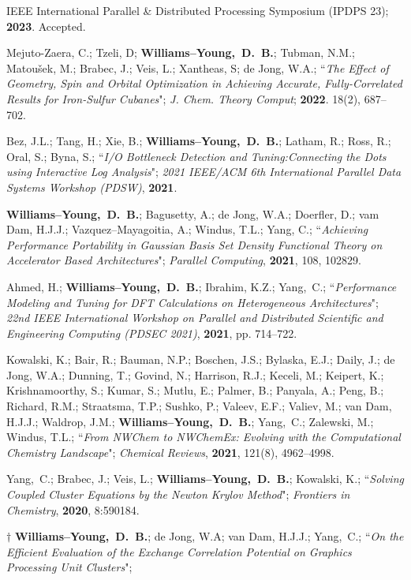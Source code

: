 \documentclass[10pt]{res} %
\newcommand*\me[0]{{\bf Williams--Young,~D.~B.}}
\newcommand*\cy[0]{Yang,~C.}
\begin{document}
\begin{resume}
\begin{etaremune}
        IEEE International Parallel \& Distributed Processing Symposium (IPDPS 23); \textbf{2023}. Accepted.
  \item Mejuto-Zaera, C.; Tzeli, D; \me; Tubman, N.M.; Matoušek, M.; Brabec, J.; Veis, L.; Xantheas, S; de Jong, W.A.; 
       ``\emph{The Effect of Geometry, Spin and Orbital Optimization in Achieving Accurate, Fully-Correlated Results for Iron-Sulfur 
                Cubanes}"; \emph{J. Chem. Theory Comput}; \textbf{2022}. 18(2), 687–702.
  \item Bez, J.L.; Tang, H.; Xie, B.; \me; Latham, R.; Ross, R.; Oral, S.; Byna, S.;
        ``\emph{I/O Bottleneck Detection and Tuning:Connecting the Dots using Interactive Log Analysis}";
        \emph{2021 IEEE/ACM 6th International Parallel Data Systems Workshop (PDSW)}, 
        \textbf{2021}.
  \item \me; Bagusetty, A.; de Jong, W.A.; Doerfler, D.; vam Dam, H.J.J.; Vazquez--Mayagoitia, A.;
        Windus, T.L.; Yang, C.;
        ``\emph{Achieving Performance Portability in Gaussian Basis Set Density Functional Theory 
                on Accelerator Based Architectures}"; \emph{Parallel Computing},
        \textbf{2021}, 108, 102829.
  \item Ahmed, H.; \me; Ibrahim, K.Z.; \cy;
        ``\emph{Performance Modeling and Tuning for DFT Calculations on Heterogeneous Architectures}";
        \emph{22nd IEEE International Workshop on Parallel and Distributed Scientific and Engineering Computing (PDSEC 2021)},
        \textbf{2021}, pp. 714--722.
  \item Kowalski, K.; Bair, R.; Bauman, N.P.; Boschen, J.S.; Bylaska, E.J.; Daily, J.; de Jong, W.A.; 
        Dunning, T.; Govind, N.; Harrison, R.J.; Keceli, M.; Keipert, K.; Krishnamoorthy, S.; Kumar, S.;
        Mutlu, E.; Palmer, B.; Panyala, A.; Peng, B.; Richard, R.M.; Straatsma, T.P.; Sushko, P.; Valeev, E.F.;
        Valiev, M.; van Dam, H.J.J.; Waldrop, J.M.; \me; \cy; Zalewski, M.; Windus, T.L.;
       ``\emph{From NWChem to NWChemEx: Evolving with the Computational Chemistry Landscape}"; \emph{Chemical Reviews},
       \textbf{2021}, 121(8), 4962--4998.
  \item \cy; Brabec, J.; Veis, L.; \me; Kowalski, K.;
        ``\emph{Solving Coupled Cluster Equations by the Newton Krylov Method}";
        \emph{Frontiers in Chemistry}, \textbf{2020}, 8:590184.
  \item $\dagger$ \me; de Jong, W.A; van Dam, H.J.J.; \cy;
        ``\emph{On the Efficient Evaluation of the Exchange Correlation Potential on Graphics Processing Unit Clusters}";

\end{etaremune}
\end{resume}
\end{document}
